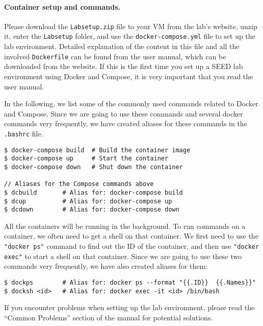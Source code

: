 

\paragraph{Container setup and commands.}
Please download the
\texttt{Labsetup.zip} file to your VM from the lab's website,
unzip it, enter the \texttt{Labsetup} folder, and 
use the \texttt{docker-compose.yml} file to 
set up the lab environment. Detailed explanation
of the content in this file and all the involved 
\texttt{Dockerfile} can be found from the 
user manual, which can be downloaded from the website. 
If this is the first time you set up a SEED lab environment
using Docker and Compose, it is very important that you read 
the user manual. 

In the following, we list some of the commonly
used commands related to Docker and Compose. 
Since we are going to use 
these commands and several docker commands very
frequently, we have created aliases for these commands
in the \texttt{.bashrc} file.  


\begin{lstlisting}
$ docker-compose build  # Build the container image
$ docker-compose up     # Start the container
$ docker-compose down   # Shut down the container

// Aliases for the Compose commands above
$ dcbuild       # Alias for: docker-compose build
$ dcup          # Alias for: docker-compose up
$ dcdown        # Alias for: docker-compose down
\end{lstlisting}


All the containers will be running in the background. To run
commands on a container, we often need to get a shell on
that container. We first need to use the \texttt{"docker ps"}  
command to find out the ID of the container, and then
use \texttt{"docker exec"} to start a shell on that 
container. Since we are going to use these two commands
very frequently, we have also created aliases
for them:

\begin{lstlisting}
$ dockps        # Alias for: docker ps --format "{{.ID}}  {{.Names}}" 
$ docksh <id>   # Alias for: docker exec -it <id> /bin/bash
\end{lstlisting}


If you encounter problems when setting up the lab environment, 
please read the ``Common Problems'' section of the manual
for potential solutions.

